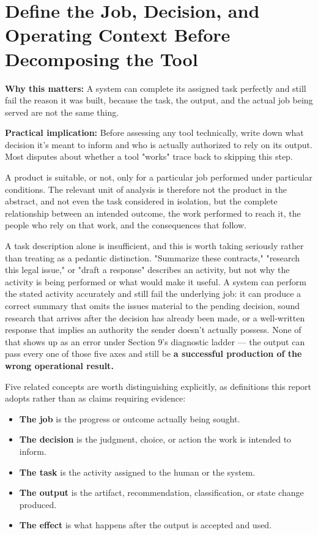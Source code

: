 \section{Define the Job, Decision, and Operating Context Before Decomposing the Tool}

\textbf{Why this matters:} A system can complete its assigned task perfectly and still fail the reason it was built, because the task, the output, and the actual job being served are not the same thing.

\textbf{Practical implication:} Before assessing any tool technically, write down what decision it's meant to inform and who is actually authorized to rely on its output. Most disputes about whether a tool "works" trace back to skipping this step.

A product is suitable, or not, only for a particular job performed under particular conditions. The relevant unit of analysis is therefore not the product in the abstract, and not even the task considered in isolation, but the complete relationship between an intended outcome, the work performed to reach it, the people who rely on that work, and the consequences that follow.

A task description alone is insufficient, and this is worth taking seriously rather than treating as a pedantic distinction. "Summarize these contracts," "research this legal issue," or "draft a response" describes an activity, but not why the activity is being performed or what would make it useful. A system can perform the stated activity accurately and still fail the underlying job: it can produce a correct summary that omits the issues material to the pending decision, sound research that arrives after the decision has already been made, or a well-written response that implies an authority the sender doesn't actually possess. None of that shows up as an error under Section 9's diagnostic ladder --- the output can pass every one of those five axes and still be \textbf{a successful production of the wrong operational result.}

Five related concepts are worth distinguishing explicitly, as definitions this report adopts rather than as claims requiring evidence:

\begin{itemize}
\item \textbf{The job} is the progress or outcome actually being sought.
\item \textbf{The decision} is the judgment, choice, or action the work is intended to inform.
\item \textbf{The task} is the activity assigned to the human or the system.
\item \textbf{The output} is the artifact, recommendation, classification, or state change produced.
\item \textbf{The effect} is what happens after the output is accepted and used.
\end{itemize}

